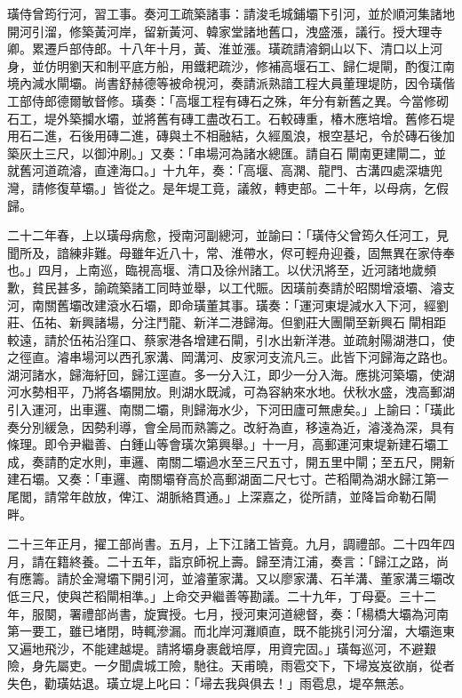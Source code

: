 \begin{pinyinscope}
璜侍曾筠行河，習工事。奏河工疏築諸事：請浚毛城鋪壩下引河，並於順河集諸地開河引溜，修築黃河岸，留新黃河、韓家堂諸地舊口，洩盛漲，議行。授大理寺卿。累遷戶部侍郎。十八年十月，黃、淮並漲。璜疏請濬銅山以下、清口以上河身，並仿明劉天和制平底方船，用鐵耙疏沙，修補高堰石工、歸仁堤閘，酌復江南境內減水閘壩。尚書舒赫德等被命視河，奏請派熟諳工程大員董理堤防，因令璜偕工部侍郎德爾敏督修。璜奏：「高堰工程有磚石之殊，年分有新舊之異。今當修砌石工，堤外築攔水壩，並將舊有磚工盡改石工。石較磚重，椿木應培增。舊修石堤用石二進，石後用磚二進，磚與土不相融結，久經風浪，根空基圮，令於磚石後加築灰土三尺，以御沖刷。」又奏：「串場河為諸水總匯。請自石閘南更建閘二，並就舊河道疏濬，直達海口。」十九年，奏：「高堰、高澖、龍門、古溝四處深塘兜灣，請修復草壩。」皆從之。是年堤工竟，議敘，轉吏部。二十年，以母病，乞假歸。

二十二年春，上以璜母病愈，授南河副總河，並諭曰：「璜侍父曾筠久任河工，見聞所及，諳練非難。母雖年近八十，常、淮帶水，侭可輕舟迎養，固無異在家侍奉也。」四月，上南巡，臨視高堰、清口及徐州諸工。以伏汛將至，近河諸地歲頻歉，貧民甚多，諭疏築諸工同時並舉，以工代賑。因璜前奏請於昭關增滾壩、濬支河，南關舊壩改建滾水石壩，即命璜董其事。璜奏：「運河東堤減水入下河，經劉莊、伍祐、新興諸場，分注鬥龍、新洋二港歸海。但劉莊大團閘至新興石閘相距較遠，請於伍祐沿窪口、蔡家港各增建石閘，引水出新洋港。並疏射陽湖港口，使之徑直。濬串場河以西孔家溝、岡溝河、皮家河支流凡三。此皆下河歸海之路也。湖河諸水，歸海紆回，歸江逕直。多一分入江，即少一分入海。應挑河築壩，使湖河水勢相平，乃將各壩開放。則湖水既減，可為容納來水地。伏秋水盛，洩高郵湖引入運河，出車邏、南關二壩，則歸海水少，下河田廬可無慮矣。」上諭曰：「璜此奏分別緩急，因勢利導，會全局而熟籌之。改紆為直，移遠為近，濬淺為深，具有條理。即令尹繼善、白鍾山等會璜次第興舉。」十一月，高郵運河東堤新建石壩工成，奏請酌定水則，車邏、南關二壩過水至三尺五寸，開五里中閘；至五尺，開新建石壩。又奏：「車邏、南關壩脊高於高郵湖面二尺七寸。芒稻閘為湖水歸江第一尾閭，請常年啟放，俾江、湖脈絡貫通。」上深嘉之，從所請，並降旨命勒石閘畔。

二十三年正月，擢工部尚書。五月，上下江諸工皆竟。九月，調禮部。二十四年四月，請在籍終養。二十五年，詣京師祝上壽。歸至清江浦，奏言：「歸江之路，尚有應籌。請於金灣壩下開引河，並濬董家溝。又以廖家溝、石羊溝、董家溝三壩改低三尺，使與芒稻閘相準。」上命交尹繼善等勘議。二十九年，丁母憂。三十二年，服闋，署禮部尚書，旋實授。七月，授河東河道總督，奏：「楊橋大壩為河南第一要工，雖已堵閉，時輒滲漏。而北岸河灘順直，既不能挑引河分溜，大壩迤東又遍地飛沙，不能建越堤。請將壩身裹戧培厚，用資完固。」璜每巡河，不避艱險，身先屬吏。一夕聞虞城工險，馳往。天甫曉，雨雹交下，下埽岌岌欲崩，從者失色，勸璜姑退。璜立堤上叱曰：「埽去我與俱去！」雨雹息，堤卒無恙。


\end{pinyinscope}
